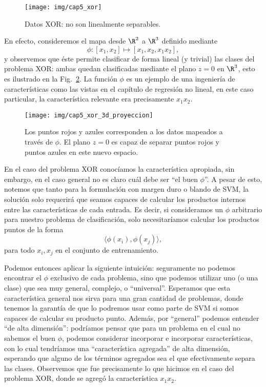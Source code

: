 \begin{figure}[ht]
    \centering
    \texttt{[image: img/cap5\_xor]}
    \caption{Datos XOR: no son linealmente separables.}
    \label{fig:xor}
\end{figure}

En efecto, consideremos el mapa desde  $\R^2$ a $\R^3$ definido mediante
\begin{equation}
    \phi: [x_1, x_2] \mapsto [x_1, x_2, x_1 x_2],
\end{equation}
y observemos que éste permite clasificar de forma lineal (y trivial) las clases del problema XOR: ambas quedan clasificadas mediante el plano $z=0$ en $\R^3$, esto es ilustrado en la Fig.~\ref{fig:xor_proyectado}. La función $\phi$ es un ejemplo de una ingeniería de características como las vistas en el capítulo de regresión no lineal, en este caso particular, la característica relevante era precisamente $x_1x_2$.

\begin{figure}[ht]
    \centering
    \texttt{[image: img/cap5\_xor\_3d\_proyeccion]}
    \caption{Los puntos rojos y azules corresponden a los datos mapeados a través de $\phi$. El plano $z=0$ es capaz de separar puntos rojos y puntos azules en este nuevo espacio.}
    \label{fig:xor_proyectado}
\end{figure}


\begin{remark}
En el caso del problema XOR conocíamos la característica apropiada, sin embargo, en el caso general no es claro cuál debe ser ``el buen $\phi$''. A pesar de esto, notemos que tanto para la formulación con margen duro o blando de SVM, la solución solo requerirá que seamos capaces de calcular los productos internos entre las características de cada entrada. Es decir, si consideramos un $\phi$ arbitrario para nuestro problema de clasificación, solo necesitaríamos calcular los productos puntos de la forma
\begin{equation}
    \langle \phi(x_i) , \phi(x_j) \rangle, 
\end{equation}
para todo $x_i,x_j$ en el conjunto de entrenamiento. 
\end{remark}

Podemos entonces aplicar la siguiente intuición: seguramente no podemos encontrar el $\phi$ exclusivo de cada problema, sino que podemos utilizar uno (o una clase) que sea muy general, complejo, o ``universal''. Esperamos que esta característica general nos sirva para una gran cantidad de problemas, donde tenemos la garantía de que lo podremos usar como parte de SVM si somos capaces de calcular su producto punto. Además, por ``general'' podemos entender ``de alta dimensión'': podríamos pensar que para un problema en el cual no sabemos el buen $\phi$, podemos considerar incorporar e incorporar características, con lo cual tendríamos una ``característica agregada'' de alta dimensión, esperando que alguno de los términos agregados sea el que efectivamente separa las clases. Observemos que fue precisamente lo que hicimos en el caso del problema XOR, donde se agregó la característica $x_1x_2$. 

